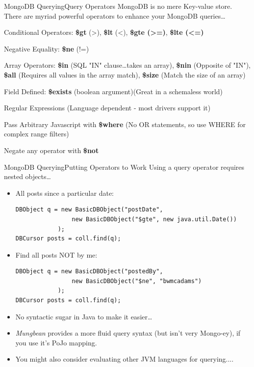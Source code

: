 \documentclass{beamer}
\begin{document}
\begin{frame}{MongoDB Querying}{Query Operators}
     MongoDB is no mere Key-value store. There are myriad powerful operators to enhance your MongoDB queries\ldots
    \begin{itemize}{\small
        \item Conditional Operators: {\bf \$gt} (>), {\bf \$lt} (<), {\bf \$gte (>=)},  {\bf \$lte (<=)}
        \item Negative Equality: {\bf \$ne} (!=) 
        \item Array Operators: {\bf \$in} (SQL "IN" clause\ldots takes an array), {\bf \$nin} (Opposite of "IN"), {\bf \$all} (Requires all values in the array match), {\bf \$size} (Match the size of an array)
        \item Field Defined: {\bf \$exists} (boolean argument)(Great in a schemaless world)
        \item Regular Expressions (Language dependent - most drivers support it)
        \item Pass Arbitrary Javascript with {\bf \$where} (No OR statements, so use WHERE for complex range filters)
        \item Negate any operator with {\bf \$not}
        }
    \end{itemize}
\end{frame}

\begin{frame}[fragile]{MongoDB Querying}{Putting Operators to Work}
    Using a query operator requires nested objects\ldots
    \begin{itemize}
        \item<2-> All posts since a particular date:\\ \begin{lstlisting}
DBObject q = new BasicDBObject("postDate", 
                new BasicDBObject("$gte", new java.util.Date())
            ); 
DBCursor posts = coll.find(q);
\end{lstlisting}
        \item<3-> Find all posts NOT by me:\\ \begin{lstlisting}
DBObject q = new BasicDBObject("postedBy", 
                new BasicDBObject("$ne", "bwmcadams")
            );
DBCursor posts = coll.find(q);
\end{lstlisting}
        \item<4-> No syntactic sugar in Java to make it easier\ldots
        \item<5-> {\em Mungbean} provides a more fluid query syntax (but isn't very Mongo-ey), if you use it's PoJo mapping.
        \item<6-> You might also consider evaluating other JVM languages for querying....

    \end{itemize}
\end{frame}
\end{document}
